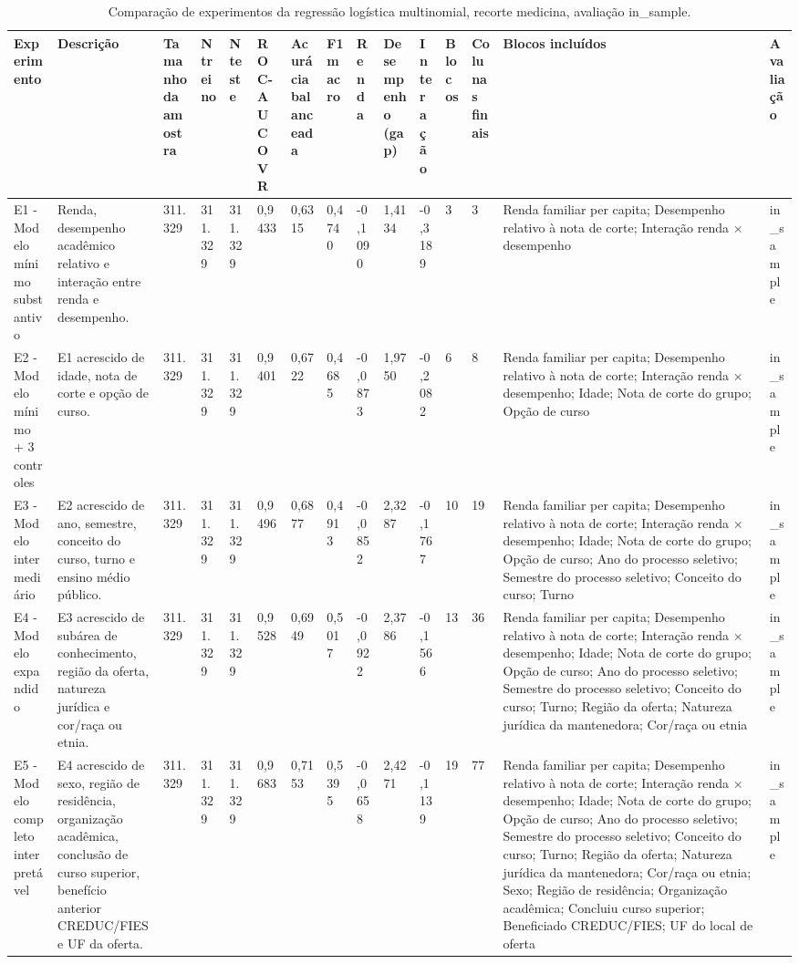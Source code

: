 \begin{table}
\caption{Comparação de experimentos da regressão logística multinomial, recorte medicina, avaliação in_sample.}
\label{tab:tabela_logit_ternario_recorte_medicina_in_sample}
\begin{tabular}{lllllllllllllll}
\toprule
Experimento & Descrição & Tamanho da amostra & N treino & N teste & ROC-AUC OVR & Acurácia balanceada & F1 macro & Renda & Desempenho (gap) & Interação & Blocos & Colunas finais & Blocos incluídos & Avaliação \\
\midrule
E1 - Modelo mínimo substantivo & Renda, desempenho acadêmico relativo e interação entre renda e desempenho. & 311.329 & 311.329 & 311.329 & 0,9433 & 0,6315 & 0,4740 & -0,1090 & 1,4134 & -0,3189 & 3 & 3 & Renda familiar per capita; Desempenho relativo à nota de corte; Interação renda × desempenho & in\_sample \\
E2 - Modelo mínimo + 3 controles & E1 acrescido de idade, nota de corte e opção de curso. & 311.329 & 311.329 & 311.329 & 0,9401 & 0,6722 & 0,4685 & -0,0873 & 1,9750 & -0,2082 & 6 & 8 & Renda familiar per capita; Desempenho relativo à nota de corte; Interação renda × desempenho; Idade; Nota de corte do grupo; Opção de curso & in\_sample \\
E3 - Modelo intermediário & E2 acrescido de ano, semestre, conceito do curso, turno e ensino médio público. & 311.329 & 311.329 & 311.329 & 0,9496 & 0,6877 & 0,4913 & -0,0852 & 2,3287 & -0,1767 & 10 & 19 & Renda familiar per capita; Desempenho relativo à nota de corte; Interação renda × desempenho; Idade; Nota de corte do grupo; Opção de curso; Ano do processo seletivo; Semestre do processo seletivo; Conceito do curso; Turno & in\_sample \\
E4 - Modelo expandido & E3 acrescido de subárea de conhecimento, região da oferta, natureza jurídica e cor/raça ou etnia. & 311.329 & 311.329 & 311.329 & 0,9528 & 0,6949 & 0,5017 & -0,0922 & 2,3786 & -0,1566 & 13 & 36 & Renda familiar per capita; Desempenho relativo à nota de corte; Interação renda × desempenho; Idade; Nota de corte do grupo; Opção de curso; Ano do processo seletivo; Semestre do processo seletivo; Conceito do curso; Turno; Região da oferta; Natureza jurídica da mantenedora; Cor/raça ou etnia & in\_sample \\
E5 - Modelo completo interpretável & E4 acrescido de sexo, região de residência, organização acadêmica, conclusão de curso superior, benefício anterior CREDUC/FIES e UF da oferta. & 311.329 & 311.329 & 311.329 & 0,9683 & 0,7153 & 0,5395 & -0,0658 & 2,4271 & -0,1139 & 19 & 77 & Renda familiar per capita; Desempenho relativo à nota de corte; Interação renda × desempenho; Idade; Nota de corte do grupo; Opção de curso; Ano do processo seletivo; Semestre do processo seletivo; Conceito do curso; Turno; Região da oferta; Natureza jurídica da mantenedora; Cor/raça ou etnia; Sexo; Região de residência; Organização acadêmica; Concluiu curso superior; Beneficiado CREDUC/FIES; UF do local de oferta & in\_sample \\
\bottomrule
\end{tabular}
\end{table}

